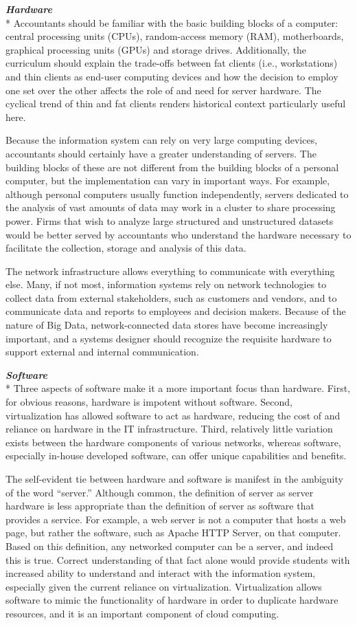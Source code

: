 \documentclass[12pt]{article}
\newcommand{\SubSubSection}[1]{{\centering{}\normalsize{}\textbf{\emph{#1}}}\\*\indent{}}
\begin{document}
\SubSubSection{Hardware}
Accountants should be familiar with the basic building blocks of a computer: central processing units (CPUs), random-access memory (RAM), motherboards, graphical processing units (GPUs) and storage drives. Additionally, the curriculum should explain the trade-offs between fat clients (i.e., workstations) and thin clients as end-user computing devices and how the decision to employ one set over the other affects the role of and need for server hardware. The cyclical trend of thin and fat clients renders historical context particularly useful here.

Because the information system can rely on very large computing devices, accountants should certainly have a greater understanding of servers. The building blocks of these are not different from the building blocks of a personal computer, but the implementation can vary in important ways. For example, although personal computers usually function independently, servers dedicated to the analysis of vast amounts of data may work in a cluster to share processing power. Firms that wish to analyze large structured and unstructured datasets would be better served by accountants who understand the hardware necessary to facilitate the collection, storage and analysis of this data.

The network infrastructure allows everything to communicate with everything else. Many, if not most, information systems rely on network technologies to collect data from external stakeholders, such as customers and vendors, and to communicate data and reports to employees and decision makers. Because of the nature of Big Data, network-connected data stores have become increasingly important, and a systems designer should recognize the requisite hardware to support external and internal communication.

\SubSubSection{Software}
Three aspects of software make it a more important focus than hardware. First, for obvious reasons, hardware is impotent without software. Second, virtualization has allowed software to act as hardware, reducing the cost of and reliance on hardware in the IT infrastructure. Third, relatively little variation exists between the hardware components of various networks, whereas software, especially in-house developed software, can offer unique capabilities and benefits.

The self-evident tie between hardware and software is manifest in the ambiguity of the word ``server.'' Although common, the definition of server as server hardware is less appropriate than the definition of server as software that provides a service. For example, a web server is not a computer that hosts a web page, but rather the software, such as Apache HTTP Server, on that computer. Based on this definition, any networked computer can be a server, and indeed this is true. Correct understanding of that fact alone would provide students with increased ability to understand and interact with the information system, especially given the current reliance on virtualization. Virtualization allows software to mimic the functionality of hardware in order to duplicate hardware resources, and it is an important component of cloud computing.
\end{document}
